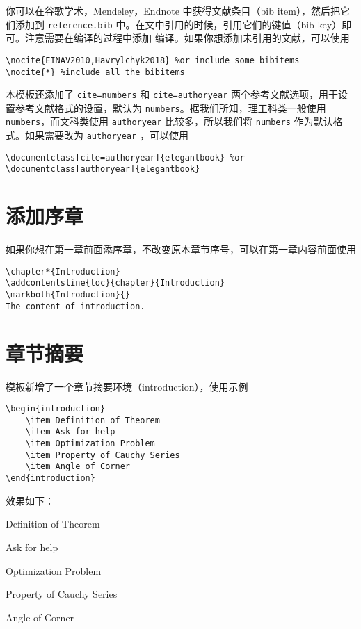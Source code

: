 \documentclass[cn,11pt]{elegantbook}
\begin{document}
你可以在谷歌学术，Mendeley，Endnote 中获得文献条目（bib item），然后把它们添加到 \lstinline{reference.bib} 中。在文中引用的时候，引用它们的键值（bib key）即可。注意需要在编译的过程中添加  编译。如果你想添加未引用的文献，可以使用
\begin{lstlisting}[frame=single]
\nocite{EINAV2010,Havrylchyk2018} %or include some bibitems
\nocite{*} %include all the bibitems
\end{lstlisting}

本模板还添加了 \lstinline{cite=numbers} 和 \lstinline{cite=authoryear} 两个参考文献选项，用于设置参考文献格式的设置，默认为 \lstinline{numbers}。据我们所知，理工科类一般使用 \lstinline{numbers}，而文科类使用 \lstinline{authoryear} 比较多，所以我们将 \lstinline{numbers} 作为默认格式。如果需要改为  \lstinline{authoryear} ，可以使用
\begin{lstlisting}
\documentclass[cite=authoryear]{elegantbook} %or
\documentclass[authoryear]{elegantbook}
\end{lstlisting}

\section{添加序章}

如果你想在第一章前面添序章，不改变原本章节序号，可以在第一章内容前面使用 
\begin{lstlisting}
\chapter*{Introduction}
\addcontentsline{toc}{chapter}{Introduction} 
\markboth{Introduction}{} 
The content of introduction.
\end{lstlisting}

\section{章节摘要}
模板新增了一个章节摘要环境（introduction），使用示例
\begin{lstlisting}
\begin{introduction}
	\item Definition of Theorem
	\item Ask for help
	\item Optimization Problem
	\item Property of Cauchy Series
	\item Angle of Corner
\end{introduction}
\end{lstlisting}
效果如下：
\begin{introduction}
	\item Definition of Theorem
	\item Ask for help
	\item Optimization Problem
	\item Property of Cauchy Series
	\item Angle of Corner
\end{introduction}
\end{document}
